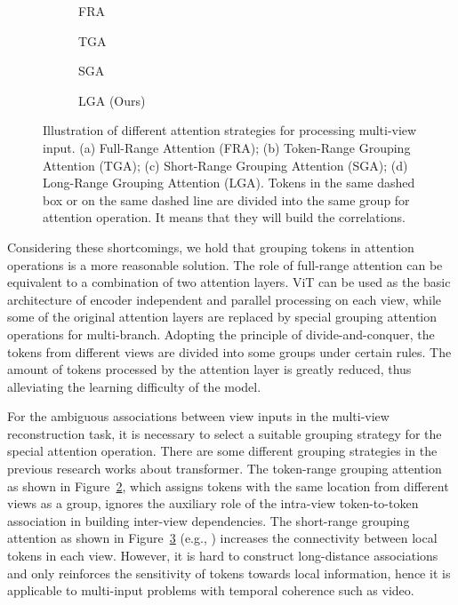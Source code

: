 \documentclass[10pt,twocolumn,letterpaper]{article}
\newcommand{\rulesep}{\unskip\hfill{\color{gray}\vrule}\hfill\ignorespaces}
\begin{document}
\begin{figure*}
  \centering
  \begin{subfigure}{0.226\linewidth}
    \caption{FRA}
    \label{full_range}
  \end{subfigure}
  \rulesep
  \begin{subfigure}{0.222\linewidth}
    \caption{TGA}
    \label{token_range}
  \end{subfigure}
  \rulesep
  \begin{subfigure}{0.26\linewidth}
    \caption{SGA}
    \label{short_range}
  \end{subfigure}
  \rulesep
  \begin{subfigure}{0.26\linewidth}
    \caption{LGA (Ours)}
    \label{long_range}
  \end{subfigure}
  \caption{Illustration of different attention strategies for processing multi-view input. (a) Full-Range Attention (FRA); (b) Token-Range Grouping Attention (TGA); (c) Short-Range Grouping Attention (SGA); (d) Long-Range Grouping Attention (LGA). Tokens in the same dashed box or on the same dashed line are divided into the same group for attention operation. It means that they will build the correlations.}
  \label{highlight}
\end{figure*}

Considering these shortcomings, we hold that grouping tokens in attention operations is a more reasonable solution. The role of full-range attention can be equivalent to a combination of two attention layers. ViT can be used as the basic architecture of encoder independent and parallel processing on each view, while some of the original attention layers are replaced by special grouping attention operations for multi-branch. Adopting the principle of divide-and-conquer, the tokens from different views are divided into some groups under certain rules. The amount of tokens processed by the attention layer is greatly reduced, thus alleviating the learning difficulty of the model.

For the ambiguous associations between view inputs in the multi-view reconstruction task, it is necessary to select a suitable grouping strategy for the special attention operation. 
There are some different grouping strategies in the previous research works about transformer. The token-range grouping attention as shown in Figure~\ref{token_range}, which assigns tokens with the same location from different views as a group, ignores the auxiliary role of the intra-view token-to-token association in building inter-view dependencies. The short-range grouping attention as shown in Figure~\ref{short_range} (e.g., \cite{liu2021decoupled}) increases the connectivity between local tokens in each view. However, it is hard to construct long-distance associations and only reinforces the sensitivity of tokens towards local information, hence it is applicable to multi-input problems with temporal coherence such as video.
\end{document}
